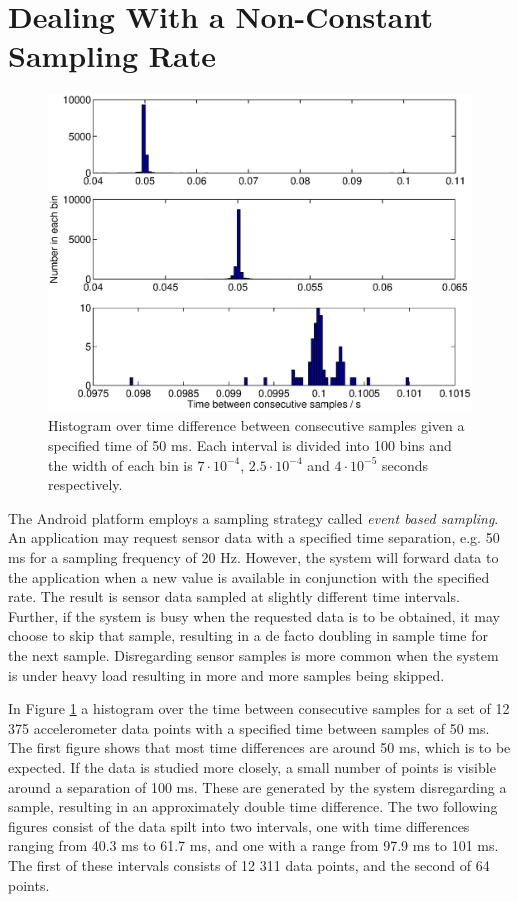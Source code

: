 \documentclass{LTHthesis}
\begin{document}
\section{Dealing With a Non-Constant Sampling Rate}
%
\begin{figure}[!hbt]

\includegraphics[width=1\textwidth ]{images/kinematic/sample_diff}
\caption{Histogram over time difference between consecutive samples given a specified time of 50 ms. Each interval is divided into 100 bins and the width of each bin is $7\cdot10^{-4}$, $2.5\cdot10^{-4}$ and $4\cdot10^{-5}$ seconds respectively.}\label{sample_diff}
\end{figure}
%
The Android platform employs a sampling strategy called \emph{event based sampling}. An application may request sensor data with a specified time separation, e.g. 50 ms for a sampling frequency of 20 Hz. However, the system will forward data to the application when a new value is available in conjunction with the specified rate. The result is sensor data sampled at slightly different time intervals. Further, if the system is busy when the requested data is to be obtained, it may choose to skip that sample, resulting in a de facto doubling in sample time for the next sample. Disregarding sensor samples is more common when the system is under heavy load resulting in more and more samples being skipped.

In Figure \ref{sample_diff} a histogram over the time between consecutive samples for a set of 12 375 accelerometer data points with a specified time between samples of 50 ms. The first figure shows that most time differences are around 50 ms, which is to be expected. If the data is studied more closely, a small number of points is visible around a separation of 100 ms. These are generated by the system disregarding a sample, resulting in an approximately double time difference. The two following figures consist of the data spilt into two intervals, one with time differences ranging from 
40.3 ms to 61.7 ms, and one with a range from 97.9 ms to 101 ms. The first of these intervals consists of 12 311 data points, and the second of 64 points. 
\end{document}
